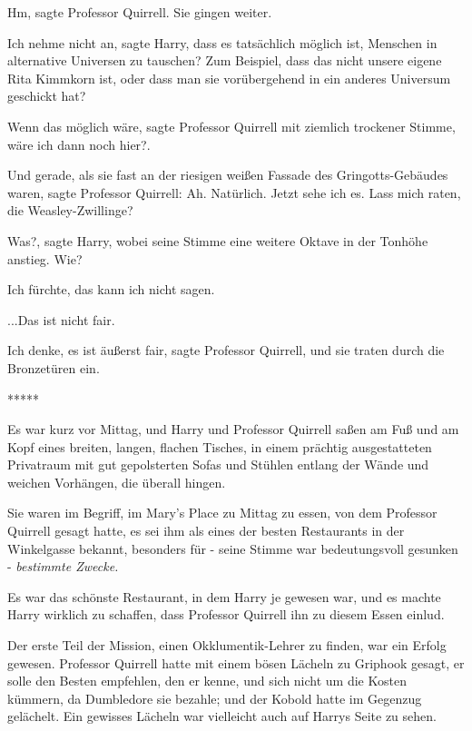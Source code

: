 \glqq{}Hm\grqq{}, sagte Professor Quirrell. Sie gingen weiter.

\glqq{}Ich nehme nicht an\grqq{}, sagte Harry, \glqq{}dass es tatsächlich
möglich ist, Menschen in alternative Universen zu tauschen? Zum Beispiel, dass
das nicht unsere eigene Rita Kimmkorn ist, oder dass man sie vorübergehend in
ein anderes Universum geschickt hat?\grqq{}

\glqq{}Wenn das möglich wäre\grqq{}, sagte Professor Quirrell mit ziemlich
trockener Stimme, \glqq{}wäre ich dann noch hier?\grqq{}.

Und gerade, als sie fast an der riesigen weißen Fassade des Gringotts-Gebäudes
waren, sagte Professor Quirrell: \glqq{}Ah. Natürlich. Jetzt sehe ich es. Lass
mich raten, die Weasley-Zwillinge?\grqq{}

\glqq{}Was?\grqq{}, sagte Harry, wobei seine Stimme eine weitere Oktave in der
Tonhöhe anstieg. \glqq{}Wie?\grqq{}

\glqq{}Ich fürchte, das kann ich nicht sagen.\grqq{}

\glqq{}...Das ist nicht fair.\grqq{}

\glqq{}Ich denke, es ist äußerst fair\grqq{}, sagte Professor Quirrell, und sie
traten durch die Bronzetüren ein.

\begin{center}*****\end{center}

Es war kurz vor Mittag, und Harry und Professor Quirrell saßen am Fuß und am
Kopf eines breiten, langen, flachen Tisches, in einem prächtig ausgestatteten
Privatraum mit gut gepolsterten Sofas und Stühlen entlang der Wände und weichen
Vorhängen, die überall hingen.

Sie waren im Begriff, im Mary's Place zu Mittag zu essen, von dem Professor
Quirrell gesagt hatte, es sei ihm als eines der besten Restaurants in der
Winkelgasse bekannt, besonders für - seine Stimme war bedeutungsvoll gesunken -
\emph{bestimmte Zwecke.}

Es war das schönste Restaurant, in dem Harry je gewesen war, und es machte Harry
wirklich zu schaffen, dass Professor Quirrell ihn zu diesem Essen einlud.

Der erste Teil der Mission, einen Okklumentik-Lehrer zu finden, war ein Erfolg
gewesen. Professor Quirrell hatte mit einem bösen Lächeln zu Griphook gesagt, er
solle den Besten empfehlen, den er kenne, und sich nicht um die Kosten kümmern,
da Dumbledore sie bezahle; und der Kobold hatte im Gegenzug gelächelt. Ein
gewisses Lächeln war vielleicht auch auf Harrys Seite zu sehen.

